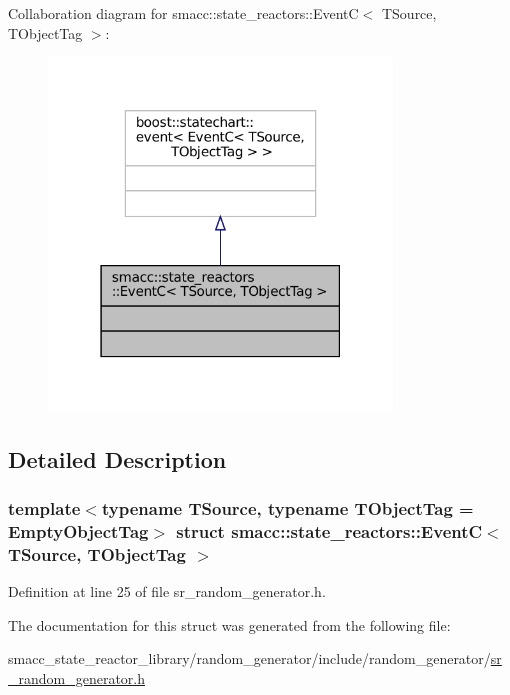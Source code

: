 Collaboration diagram for smacc\+:\+:state\+\_\+reactors\+:\+:EventC$<$ T\+Source, T\+Object\+Tag $>$\+:
\nopagebreak
\begin{figure}[H]
\begin{center}
\leavevmode
\includegraphics[width=259pt]{structsmacc_1_1state__reactors_1_1EventC__coll__graph}
\end{center}
\end{figure}


\subsection{Detailed Description}
\subsubsection*{template$<$typename T\+Source, typename T\+Object\+Tag = Empty\+Object\+Tag$>$\newline
struct smacc\+::state\+\_\+reactors\+::\+Event\+C$<$ T\+Source, T\+Object\+Tag $>$}



Definition at line 25 of file sr\+\_\+random\+\_\+generator.\+h.



The documentation for this struct was generated from the following file\+:\begin{DoxyCompactItemize}
\item 
smacc\+\_\+state\+\_\+reactor\+\_\+library/random\+\_\+generator/include/random\+\_\+generator/\hyperlink{sr__random__generator_8h}{sr\+\_\+random\+\_\+generator.\+h}\end{DoxyCompactItemize}
